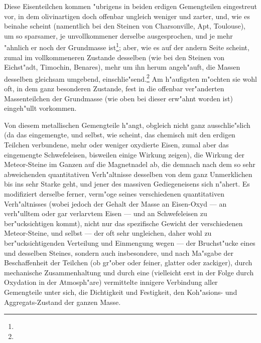 \documentclass[a4paper, 11pt, oneside, german]{article}
\begin{document}
Diese Eisenteilchen kommen "ubrigens in beiden erdigen Gemengteilen eingestreut vor, in dem olivinartigen doch offenbar ungleich weniger und zarter, und, wie es beinahe scheint (namentlich bei den Steinen von Charsonville, Apt, Toulouse), um so sparsamer, je unvollkommener derselbe ausgesprochen, und je mehr "ahnlich er noch der Grundmasse ist\footnote{}; aber, wie es auf der andern Seite scheint, zumal im vollkommeneren Zustande desselben (wie bei den Steinen von Eichst"adt, Timochin, Benares), mehr um ihn herum angeh"auft, die Massen desselben gleichsam umgebend, einschlie"send.\footnote{} Am h"aufigsten m"ochten sie wohl oft, in dem ganz besonderen Zustande, fest in die offenbar ver"anderten Massenteilchen der Grundmasse (wie oben bei dieser erw"ahnt worden ist) eingeh"ullt vorkommen.

Von diesem metallischen Gemengteile h"angt, obgleich nicht ganz ausschlie"slich (da das eingemengte, und selbst, wie scheint, das chemisch mit den erdigen Teilchen verbundene, mehr oder weniger oxydierte Eisen, zumal aber das eingemengte Schwefeleisen, bisweilen einige Wirkung zeigen), die Wirkung der Meteor-Steine im Ganzen auf die Magnetnadel ab, die demnach nach dem so sehr abweichenden quantitativen Verh"altnisse desselben von dem ganz Unmerklichen bis ins sehr Starke geht, und jener des massiven Gediegeneisens sich n"ahert. Es modifiziert derselbe ferner, verm"oge seines verschiedenen quantitativen Verh"altnisses (wobei jedoch der Gehalt der Masse an Eisen-Oxyd --- an verh"ulltem oder gar verlarvtem Eisen --- und an Schwefeleisen zu ber"ucksichtigen kommt), nicht nur das spezifische Gewicht der verschiedenen Meteor-Steine, und selbst --- der oft sehr ungleichen, daher wohl zu ber"ucksichtigenden Verteilung und Einmengung wegen --- der Bruchst"ucke eines und desselben Steines, sondern auch insbesondere, und nach Ma"sgabe der Beschaffenheit der Teilchen (ob gr"ober oder feiner, glatter oder zackiger), durch mechanische Zusammenhaltung und durch eine (vielleicht erst in der Folge durch Oxydation in der Atmosph"are) vermittelte innigere Verbindung aller Gemengteile unter sich, die Dichtigkeit und Festigkeit, den Koh"asions- und Aggregats-Zustand der ganzen Masse.
\end{document}
